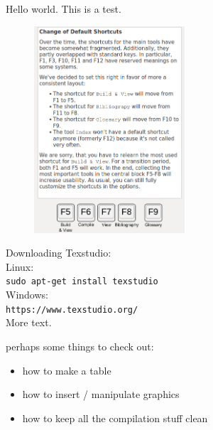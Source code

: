 \documentclass[a4paper,12pt]{article}
\begin{document}
Hello world. This is a test.
\begin{figure}[h]
	\centering
	\includegraphics[width=0.5\textwidth]{shortcut_info.png}
\end{figure}

Downloading Texstudio:\\
Linux: \\
\texttt{sudo apt-get install texstudio} \\
Windows: \\
\texttt{https://www.texstudio.org/} \\




More text.


perhaps some things to check out:
\begin{itemize} \itemsep=-0.5em
	\item how to make a table
	\item how to insert / manipulate graphics
	\item how to keep all the compilation stuff clean
\end{itemize}
\end{document}
